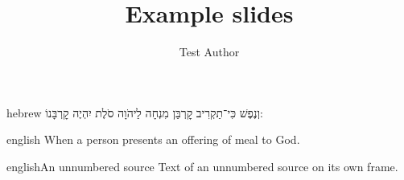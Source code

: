 \documentclass[british]{beamer}
\title{Example slides}
\author{Test Author}
\date{}
\begin{document}
\frame{\titlepage}

\begin{mekor}
\begin{mekorlang}{hebrew}
וְנֶפֶשׁ כִּי־תַקְרִיב קׇרְבַּן מִנְחָה לַיהֹוָה סֹלֶת יִהְיֶה קׇרְבָּנוֹ:
\end{mekorlang}
\begin{mekorlang}{english}
When a person presents an offering of meal to God.
\end{mekorlang}
\end{mekor}

\begin{mekor*}
\begin{mekorlang}{english}{An unnumbered source}
Text of an unnumbered source on its own frame.
\end{mekorlang}
\end{mekor*}

\end{document}
